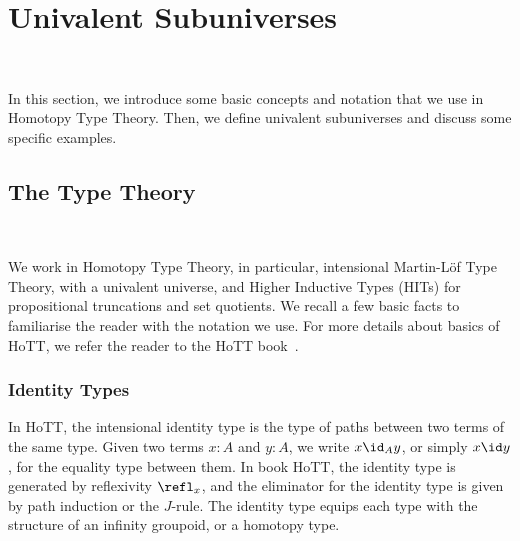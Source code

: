 \section{Univalent Subuniverses}~\label{sec:univalent}

In this section, we introduce some basic concepts and notation that we use in Homotopy Type Theory. Then, we define
univalent subuniverses and discuss some specific examples.

\subsection{The Type Theory}~\label{subsec:type-theory}

We work in Homotopy Type Theory, in particular, intensional Martin-L\"{o}f Type Theory, with a univalent universe, and
Higher Inductive Types (HITs) for propositional truncations and set quotients. We recall a few basic facts to
familiarise the reader with the notation we use. For more details about basics of HoTT, we refer the reader to the HoTT
book~\cite{univalentfoundationsprogramHomotopyTypeTheory2013}.


\subsubsection{Identity Types}


In HoTT, the intensional identity type is the type of paths between two terms of the same type. Given two terms $x:A$
and $y:A$, we write $x \id_{A} y$, or simply $x \id y$, for the equality type between them. In book HoTT, the identity
type is generated by reflexivity $\refl_{x}$, and the eliminator for the identity type is given by path induction or the
$J$-rule. The identity type equips each type with the structure of an infinity groupoid, or a homotopy type.


